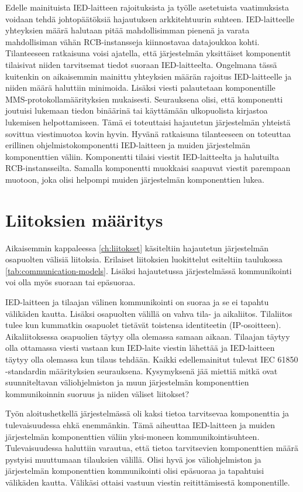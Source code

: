 Edelle mainituista IED-laitteen rajoituksista ja työlle asetetuista vaatimuksista voidaan tehdä johtopäätöksiä hajautuksen arkkitehtuurin suhteen. IED-laitteelle yhteyksien määrä halutaan pitää mahdollisimman pienenä ja varata mahdollisiman vähän RCB-instansseja kiinnostavaa datajoukkoa kohti. Tilanteeseen ratkaisuna voisi ajatella, että järjestelmän yksittäiset komponentit tilaisivat niiden tarvitsemat tiedot suoraan IED-laitteelta. Ongelmana tässä kuitenkin on aikaisemmin mainittu yhteyksien määrän rajoitus IED-laitteelle ja niiden määrä haluttiin minimoida. Lisäksi viesti palautetaan komponentille MMS-protokollamäärityksien mukaisesti. Seurauksena olisi, että komponentti joutuisi lukemaan tiedon binäärinä tai käyttämään ulkopuolista kirjastoa lukemisen helpottamiseen. Tämä ei toteuttaisi hajautetun järjestelmän yhteistä sovittua viestimuotoa kovin hyvin. Hyvänä ratkaisuna tilanteeseen on toteuttaa erillinen ohjelmistokomponentti IED-laitteen ja muiden järjestelmän komponenttien väliin. Komponentti tilaisi viestit IED-laitteelta ja halutuilta RCB-instansseilta. Samalla komponentti muokkaisi saapuvat viestit parempaan muotoon, joka olisi helpompi muiden järjestelmän komponenttien lukea.


\section{Liitoksien määritys}
Aikaisemmin kappaleessa \ref{ch:liitokset} käsiteltiin hajautetun järjestelmän osapuolten välisiä liitoksia. Erilaiset liitoksien luokittelut esiteltiin taulukossa \ref{tab:communication-models}. Lisäksi hajautetussa järjestelmässä kommunikointi voi olla myös suoraan tai epäsuoraa.

IED-laitteen ja tilaajan välinen kommunikointi on suoraa ja se ei tapahtu välikäden kautta. Lisäksi osapuolten välillä on vahva tila- ja aikaliitos. Tilaliitos tulee kun kummatkin osapuolet tietävät toistensa identiteetin (IP-osoitteen). Aikaliitoksessa osapuolien täytyy olla olemassa samaan aikaan. Tilaajan täytyy olla ottamassa viesti vastaan kun IED-laite viestin lähettää ja IED-laitteen täytyy olla olemassa kun tilaus tehdään. Kaikki edellemainitut tulevat IEC 61850 -standardin määrityksien seurauksena. Kysymyksenä jää miettiä mitkä ovat suunniteltavan väliohjelmiston ja muun järjestelmän komponenttien kommunikoinnin suoruus ja niiden väliset liitokset?

Työn aloitushetkellä järjestelmässä oli kaksi tietoa tarvitsevaa komponenttia ja tulevaisuudessa ehkä enemmänkin. Tämä aiheuttaa IED-laitteen ja muiden järjestelmän komponenttien väliin yksi-moneen kommunikointisuhteen. Tulevaisuudessa haluttiin varautua, että tietoa tarvitsevien komponenttien määrä pystyisi muuttumaan tilauksien välillä. Olisi hyvä jos väliohjelmiston ja järjestelmän komponenttien kommunikointi olisi epäsuoraa ja tapahtuisi välikäden kautta. Välikäsi ottaisi vastuun viestin reitittämisestä komponentille.

